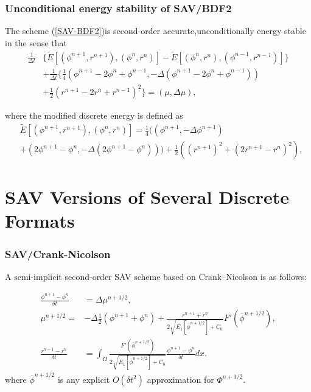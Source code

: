 \documentclass{beamer}
\begin{document}
    \begin{frame}
\frametitle{Unconditional energy stability of SAV/BDF2}

The scheme (\ref{SAV-BDF2})is second-order accurate,unconditionally energy stable in the sense that
\begin{equation}\label{the2.2}
  \begin{split}
     \frac{1}{\Delta t} & \{ \tilde{E}[ (\phi^{n+1},r^{n+1}),(\phi^n,r^n) ]-\tilde{E}[ (\phi^{n},r^{n}),(\phi^{n-1},r^{n-1}) ] \}\\
       & +\frac{1}{\Delta t}\{ \frac{1}{4}(\phi^{n+1}-2\phi^n+\phi^{n-1},-\Delta(\phi^{n+1}-2\phi^n+\phi^{n-1}))\\
       & +\frac{1}{2}(r^{n+1}-2r^n+r^{n-1})^2 \}=(\mu,\Delta \mu), 
  \end{split}
\end{equation}

where the modified discrete energy is defined as
\begin{equation}\label{the2.2.2}
  \begin{split}
     &\tilde{E}[(\phi^{n+1},r^{n+1}),(\phi^n,r^n)]=\frac{1}{4}((\phi^{n+1},-\Delta\phi^{n+1})\\
     &+(2\phi^{n+1}-\phi^n,-\Delta(2\phi^{n+1}-\phi^n)))+\frac{1}{2}\left((r^{n+1})^2+(2r^{n+1}-r^n)^2\right),
  \end{split}
\end{equation}
    \end{frame}
\section{SAV Versions of Several Discrete Formats}
    \begin{frame}
\frametitle{SAV/Crank-Nicolson}

A semi-implicit second-order SAV scheme based on Crank–Nicolson is as follows:

\begin{equation}\label{SAV-CN}
  \begin{split}
\frac{\phi^{n+1}-\phi^n}{\delta t}&=\Delta\mu^{n+1/2},\\
\mu^{n+1/2}=&-\Delta\frac{1}{2}(\phi^{n+1}+\phi^n)+\frac{r^{n+1}+r^n}{2\sqrt{E_1[\overline{\phi}^{n+1/2}]+C_0}}F'(\overline{\phi}^{n+1/2}),\\
\frac{r^{n+1}-r^n}{\delta t}&=\int_{\Omega}\frac{F'(\overline{\phi}^{n+1/2})}{2\sqrt{E_1[\overline{\phi}^{n+1/2}]+C_0}}\frac{\phi^{n+1}-\phi^n}{\delta t} dx.
  \end{split}
\end{equation}
where $\overline{\phi}^{n+1/2}$ is any explicit $O(\delta t^2)$ approximation for $\Phi^{n+1/2}$.

    \end{frame}
    
\end{document}
